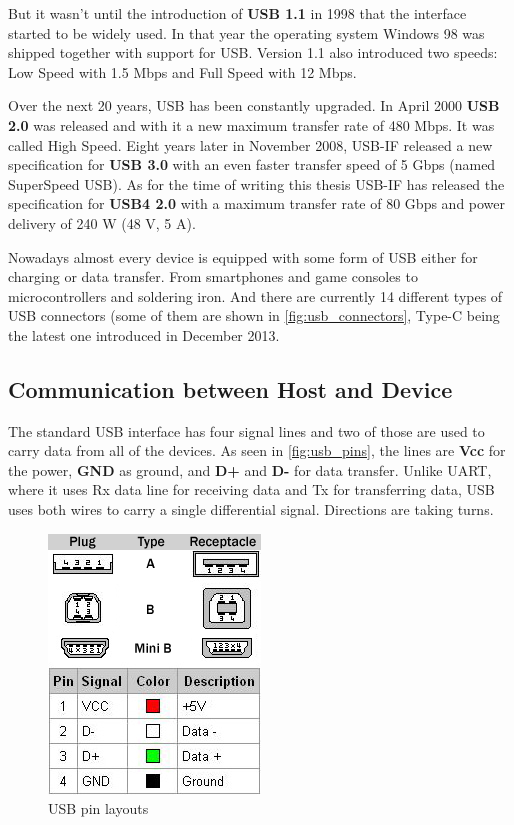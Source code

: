 But it wasn't until the introduction of \textbf{USB 1.1} in 1998 that the interface started to be widely used. In that year the operating system Windows 98 was shipped together with support for USB. Version 1.1 also introduced two speeds: Low Speed with 1.5 Mbps and Full Speed with 12 Mbps.

Over the next 20 years, USB has been constantly upgraded. In April 2000 \textbf{USB 2.0} was released and with it a new maximum transfer rate of 480 Mbps. It was called High Speed. Eight years later in November 2008, USB-IF released a new specification for \textbf{USB 3.0} with an even faster transfer speed of 5 Gbps (named SuperSpeed USB). As for the time of writing this thesis USB-IF has released the specification for \textbf{USB4 2.0} with a maximum transfer rate of 80 Gbps and power delivery of 240 W (48 V, 5 A).

Nowadays almost every device is equipped with some form of USB either for charging or data transfer. From smartphones and game consoles to microcontrollers and soldering iron. And there are currently 14 different types of USB connectors (some of them are shown in \autoref{fig:usb_connectors}, Type-C being the latest one introduced in December 2013.


\subsection*{Communication between Host and Device}
\label{communication}
The standard USB interface has four signal lines and two of those are used to carry data from all of the devices. As seen in \autoref{fig:usb_pins}, the lines are \textbf{Vcc} for the power, \textbf{GND} as ground, and \textbf{D+} and \textbf{D-} for data transfer. Unlike UART, where it uses Rx data line for receiving data and Tx for transferring data, USB uses both wires to carry a single differential signal. Directions are taking turns.

\begin{figure}[ht]
    \centering
    \includegraphics{obrazky-figures/usb_pinouts.png}
    \caption{USB pin layouts}
    \label{fig:usb_pins}
\end{figure}

